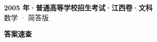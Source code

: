 \documentclass[zihao=-4, a4paper]{ctexart}
\begin{document}
\begin{center}
  {\Large\bfseries 2005 年·普通高等学校招生考试·江西卷·文科}\\[4pt]
  {\large 数学 · 简答版}
\end{center}
\medskip
{}

\clearpage
{}
\begin{center}{\Large\bfseries 答案速查}\end{center}
\medskip

\end{document}
